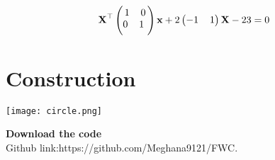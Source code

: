 \documentclass[10pt,a4paper]{report}
\newcommand{\myvec}[1]{\ensuremath{\begin{pmatrix}#1\end{pmatrix}}}
\begin{document}
\begin{multicols}{2}
\begin{align}
    \textbf{X}^\top \myvec{
    1 \hspace{4mm} 0 \\ \vspace{1mm}
    0 \hspace{4mm} 1 \
    }
    \textbf{x}+2\myvec{
    -1
    \hspace{4mm}
    1
    }\textbf{X} - 23 = 0
\end{align}

\section{Construction}
\texttt{[image: circle.png]}  

 \textbf{Download the code} \\
Github link:{https://github.com/Meghana9121/FWC}.
  \end{multicols}
\end{document}
